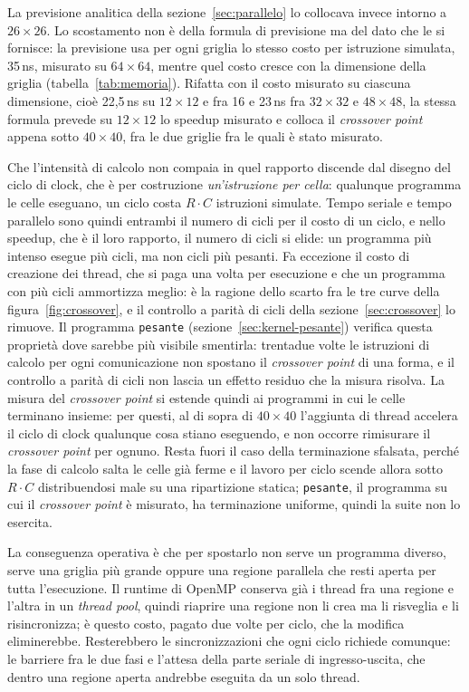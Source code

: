La previsione analitica della sezione~\ref{sec:parallelo} lo collocava invece
intorno a $26\times26$. Lo scostamento non è della formula di previsione ma del
dato che le si fornisce: la previsione usa per ogni griglia lo stesso costo per
istruzione simulata, 35\,ns, misurato su $64\times64$, mentre quel costo cresce
con la dimensione della griglia (tabella~\ref{tab:memoria}). Rifatta con il
costo misurato su ciascuna dimensione, cioè 22,5\,ns su $12\times12$ e fra 16 e
23\,ns fra $32\times32$ e $48\times48$, la stessa formula prevede su $12\times12$
lo speedup misurato e colloca il \emph{crossover point} appena sotto $40\times40$, fra le due
griglie fra le quali è stato misurato.

Che l'intensità di calcolo non compaia in quel rapporto discende dal disegno del
ciclo di clock, che è per costruzione \emph{un'istruzione per cella}: qualunque
programma le celle eseguano, un ciclo costa $R \cdot C$ istruzioni simulate.
Tempo seriale e tempo parallelo sono quindi entrambi il numero di cicli per il
costo di un ciclo, e nello speedup, che è il loro rapporto, il numero di cicli si
elide: un programma più intenso esegue più cicli, ma non cicli più pesanti. Fa
eccezione il costo di creazione dei thread, che si paga una volta per esecuzione
e che un programma con più cicli ammortizza meglio: è la ragione dello scarto
fra le tre curve della figura~\ref{fig:crossover}, e il controllo a parità di
cicli della sezione~\ref{sec:crossover} lo rimuove. Il
programma \texttt{pesante}
(sezione~\ref{sec:kernel-pesante}) verifica questa proprietà dove sarebbe più
visibile smentirla: trentadue volte le istruzioni di calcolo per ogni
comunicazione non spostano il \emph{crossover point} di una forma, e il controllo a parità di
cicli non lascia un effetto residuo che la misura risolva. La misura del
\emph{crossover point} si estende quindi ai programmi in cui le celle terminano insieme: per
questi, al di sopra di $40\times40$ l'aggiunta di thread accelera il ciclo di
clock qualunque cosa stiano eseguendo, e non occorre rimisurare il \emph{crossover point} per
ognuno. Resta fuori il caso della terminazione sfalsata, perché la fase di
calcolo salta le celle già ferme e il lavoro per ciclo scende allora sotto
$R \cdot C$ distribuendosi male su una ripartizione statica; \texttt{pesante}, il programma su cui il \emph{crossover point} è misurato, ha
terminazione uniforme, quindi la
suite non lo esercita.

La conseguenza operativa è che per spostarlo non serve un programma diverso,
serve una griglia più grande oppure una regione parallela che resti aperta per
tutta l'esecuzione. Il runtime di OpenMP conserva già i thread fra una regione e
l'altra in un \emph{thread pool}, quindi riaprire una regione non li crea ma li
risveglia e li risincronizza; è questo costo, pagato due volte per ciclo, che la
modifica eliminerebbe. Resterebbero le sincronizzazioni che ogni ciclo richiede
comunque: le barriere fra le due fasi e l'attesa della parte seriale di
ingresso-uscita, che dentro una regione aperta andrebbe eseguita da un solo
thread.

